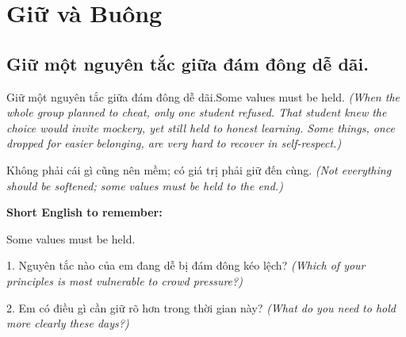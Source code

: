 \chapter{Giữ và Buông}

\section{Giữ một nguyên tắc giữa đám đông dễ dãi.}
\begin{truyen}{Giữ một nguyên tắc giữa đám đông dễ dãi.}{Some values must be held.}
\textit{(When the whole group planned to cheat, only one student refused. That student knew the choice would invite mockery, yet still held to honest learning. Some things, once dropped for easier belonging, are very hard to recover in self-respect.)}
\end{truyen}
\begin{baihoc}
Không phải cái gì cũng nên mềm; có giá trị phải giữ đến cùng.
\textit{(Not everything should be softened; some values must be held to the end.)}
\end{baihoc}
\begin{ghinhoanh}
\textbf{Short English to remember:}

Some values must be held.
\end{ghinhoanh}
\begin{tuhocnhanh}
1. Nguyên tắc nào của em đang dễ bị đám đông kéo lệch? \textit{(Which of your principles is most vulnerable to crowd pressure?)}

2. Em có điều gì cần giữ rõ hơn trong thời gian này? \textit{(What do you need to hold more clearly these days?)}
\end{tuhocnhanh}
\ngancach

